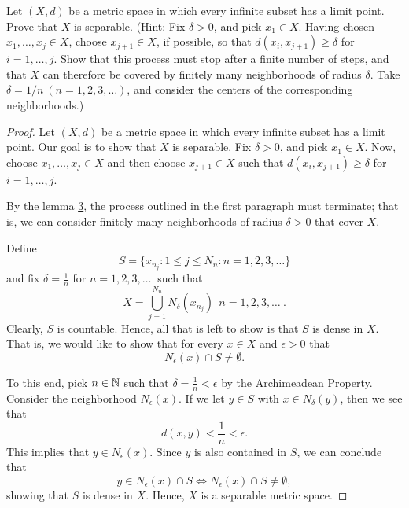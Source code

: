 \documentclass[a4paper]{article}
\begin{document}
   \begin{problem}
      Let \( (X,d)  \) be a metric space in which every infinite subset has a limit point. Prove that \( X  \) is separable. (Hint: Fix \( \delta > 0  \), and pick \( {x}_{1} \in X  \). Having chosen \( {x}_{1}, \dots, {x}_{j} \in X  \), choose \( {x}_{j+1} \in X  \), if possible, so that \( d({x}_{i}, {x}_{j+1}) \geq \delta \) for \( i = 1,\dots, j \). Show that this process must stop after a finite number of steps, and that \( X  \) can therefore be covered by finitely many neighborhoods of radius \( \delta  \). Take \( \delta = 1/n \ (n = 1,2,3,\dots) \), and consider the centers of the corresponding neighborhoods.)
   \end{problem}
   \begin{proof}
   Let \( (X,d) \) be a metric space in which every infinite subset has a limit point. Our goal is to show that \( X  \) is separable. Fix \( \delta > 0  \), and pick \( {x}_{1} \in X  \). Now, choose \( {x}_{1}, \dots, {x}_{j } \in X  \) and then choose \( {x}_{j+1} \in X  \) such that \( d({x}_{i}, {x}_{j+1}) \geq \delta \) for \( i = 1, \dots, j  \). 

     By the lemma {\hyperref[lemma 3]{3}}, the process outlined in the first paragraph must terminate; that is, we can consider finitely many neighborhoods of radius \( \delta > 0   \) that cover \( X  \).

   Define
   \[  S = \{ {x}_{{n}_{j}} : 1 \leq j \leq {N}_{n} : n = 1,2,3,\dots \} \]
    and fix \( \delta = \frac{ 1 }{ n }   \) for \( n = 1,2,3,\dots \ \) such that  
   \[  X = \bigcup_{ j=1  }^{ {N}_{n} }  {N}_{\delta}({x}_{{n}_{j}}) \ \ n = 1,2,3,\dots \ . \]
   Clearly, \( S \) is countable. Hence, all that is left to show is that \( S  \) is dense in \( X  \). That is, we would like to show that for every \( x \in X  \) and \( \epsilon > 0  \) that
   \[  {N}_{\epsilon}(x) \cap S \neq \emptyset.  \]

   To this end, pick \( n \in \mathbb{N}  \) such that \( \delta =  \frac{ 1 }{ n }  < \epsilon  \) by the Archimeadean Property. Consider the neighborhood \( {N}_{\epsilon}(x)  \). If we let \( y \in S \) with \( x \in {N}_{\delta}(y) \), then we see that  
   \[  d(x,y) < \frac{ 1 }{ n }  < \epsilon. \]
   This implies that \( y \in {N}_{\epsilon}(x) \). Since \( y  \) is also contained in \( S  \), we can conclude that
   \[  y \in {N}_{\epsilon}(x) \cap S \iff {N}_{\epsilon}(x) \cap S \neq \emptyset, \]
   showing that \( S  \) is dense in \( X  \). Hence, \( X  \) is a separable metric space.
   \end{proof}
\end{document}
